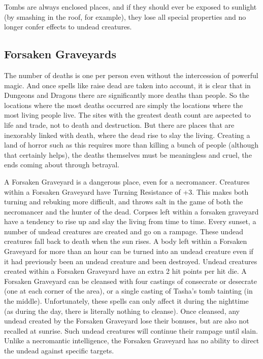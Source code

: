 Tombs are always enclosed places, and if they should ever be exposed to sunlight (by smashing in the roof, for example), they lose all special properties and no longer confer effects to undead creatures.


\subsection{Forsaken Graveyards}

The number of deaths is one per person even without the intercession of powerful magic. And once spells like raise dead are taken into account, it is clear that in Dungeons and Dragons there are significantly more deaths than people. So the locations where the most deaths occurred are simply the locations where the most living people live. The sites with the greatest death count are aspected to life and trade, not to death and destruction. But there are places that are inexorably linked with death, where the dead rise to slay the living. Creating a land of horror such as this requires more than killing a bunch of people (although that certainly helps), the deaths themselves must be meaningless and cruel, the ends coming about through betrayal.

A Forsaken Graveyard is a dangerous place, even for a necromancer. Creatures within a Forsaken Graveyard have Turning Resistance of +3. This makes both turning and rebuking more difficult, and throws salt in the game of both the necromancer and the hunter of the dead. Corpses left within a forsaken graveyard have a tendency to rise up and slay the living from time to time. Every sunset, a number of undead creatures are created and go on a rampage. These undead creatures fall back to death when the sun rises. A body left within a Forsaken Graveyard for more than an hour can be turned into an undead creature even if it had previously been an undead creature and been destroyed. Undead creatures created within a Forsaken Graveyard have an extra 2 hit points per hit die.
A Forsaken Graveyard can be cleansed with four castings of consecrate or desecrate (one at each corner of the area), or a single casting of Tasha's tomb tainting (in the middle). Unfortunately, these spells can only affect it during the nighttime (as during the day, there is literally nothing to cleanse). Once cleansed, any undead created by the Forsaken Graveyard lose their bonuses, but are also not recalled at sunrise. Such undead creatures will continue their rampage until slain. Unlike a necromantic intelligence, the Forsaken Graveyard has no ability to direct the undead against specific targets.

